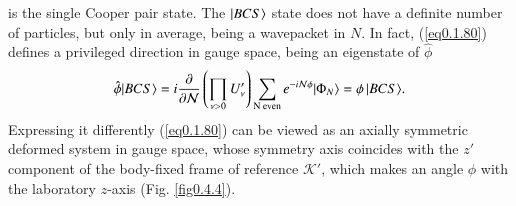 is the single Cooper pair state.  The  $|{BCS} \rangle$ state does not have a definite number of particles, but only in average, being a wavepacket in $N$. 
In fact, (\ref{eq0.1.80}) defines a privileged direction in gauge space, being an eigenstate of $\hat\phi$ 
\begin{align}\label{eq0.1.83}
\hat\phi|{BCS} \rangle=i\frac{\partial}{\partial \mathcal N}\left(\prod_{\nu>0}U'_\nu\right)\sum_{\text{N even}}e^{-i\mathcal N\phi}|{\Phi_{N}} \rangle=\phi\,|{BCS} \rangle.
\end{align}
Expressing it differently (\ref{eq0.1.80}) can be viewed as an axially symmetric deformed system in gauge space, 
 whose symmetry axis coincides with the $z'$ component of the body-fixed frame of reference $\mathcal K'$, which makes an angle $\phi$ with the laboratory $z$-axis (Fig. \ref{fig0.4.4}). 

